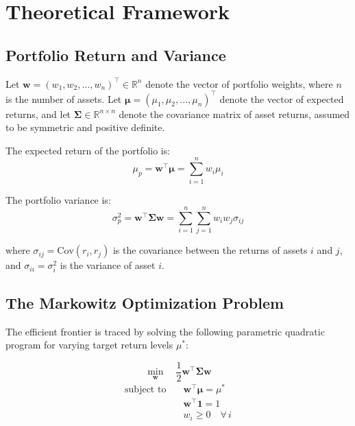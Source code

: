 \documentclass[12pt]{article}
\begin{document}
\section{Theoretical Framework}
\label{sec:theory}

\subsection{Portfolio Return and Variance}

Let $\mathbf{w} = (w_1, w_2, \ldots, w_n)^\top \in \mathbb{R}^n$ denote the
vector of portfolio weights, where $n$ is the number of assets. Let
$\boldsymbol{\mu} = (\mu_1, \mu_2, \ldots, \mu_n)^\top$ denote the vector of
expected returns, and let $\boldsymbol{\Sigma} \in \mathbb{R}^{n \times n}$
denote the covariance matrix of asset returns, assumed to be symmetric and
positive definite.

The expected return of the portfolio is:
\begin{equation}
  \mu_p = \mathbf{w}^\top \boldsymbol{\mu} = \sum_{i=1}^n w_i \mu_i
\end{equation}

The portfolio variance is:
\begin{equation}
  \sigma_p^2 = \mathbf{w}^\top \boldsymbol{\Sigma} \mathbf{w}
             = \sum_{i=1}^n \sum_{j=1}^n w_i w_j \sigma_{ij}
\end{equation}

where $\sigma_{ij} = \text{Cov}(r_i, r_j)$ is the covariance between the
returns of assets $i$ and $j$, and $\sigma_{ii} = \sigma_i^2$ is the variance
of asset $i$.

\subsection{The Markowitz Optimization Problem}

The efficient frontier is traced by solving the following parametric quadratic
program for varying target return levels $\mu^*$:

\begin{equation}
  \min_{\mathbf{w}} \quad \frac{1}{2} \mathbf{w}^\top \boldsymbol{\Sigma} \mathbf{w}
\end{equation}
\begin{align}
  \text{subject to} \quad
  & \mathbf{w}^\top \boldsymbol{\mu} = \mu^*
    \label{eq:ret_constraint} \\
  & \mathbf{w}^\top \mathbf{1} = 1
    \label{eq:budget_constraint} \\
  & w_i \geq 0 \quad \forall\, i
    \label{eq:longonly_constraint}
\end{align}
\end{document}
